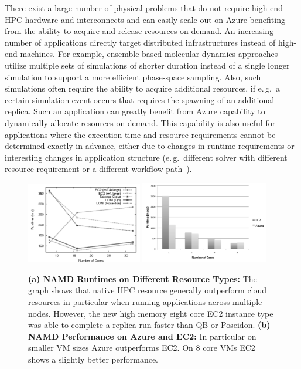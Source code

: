 \documentclass[graybox]{svmult}
\begin{document}
There exist a large number of physical problems that do not require
high-end HPC hardware and interconnects and can easily scale out on
Azure benefiting from the ability to acquire and release resources
on-demand.  An increasing number of applications directly target
distributed infrastructures instead of high-end machines. For example,
ensemble-based molecular dynamics approaches utilize multiple
sets of simulations of shorter duration instead of a single longer
simulation to support a more efficient phase-space sampling. Also,
such simulations often require the ability to acquire additional
resources, if e.\,g.\ a certain simulation event occurs that requires
the spawning of an additional replica.  Such an application can
greatly benefit from Azure capability to dynamically allocate
resources on demand. This capability is also useful for %
applications where the execution time and resource requirements cannot
be determined exactly in advance, either due to changes in runtime
requirements or interesting changes in application structure (e.\,g.\
different solver with different resource requirement or a different
workflow path~\cite{enkf_hybrid_grid_cloud}).



\begin{figure}[tbp]
  \centering
  \includegraphics[width=0.45\textwidth]{figures/namd_run-gray.pdf}
  \label{tbd}
  \includegraphics[width=0.5\textwidth]{figures/namd_ec2_azure}
  \label{fig:perf_namd_ec2_azure}
  \caption{\textbf{(a) NAMD Runtimes on Different Resource Types: }
    The graph shows that native HPC resource generally outperform
    cloud resources in particular when running applications across
    multiple nodes. However, the new high memory eight core EC2
    instance type was able to complete a replica run faster than QB or
    Poseidon. \textbf{(b) NAMD Performance on Azure and EC2:} In particular on
    smaller VM sizes Azure outperforms EC2.  On 8 core VMs EC2 shows a
    slightly better performance.}
   \label{fig:performance_namd_run}
\end{figure}
\end{document}
